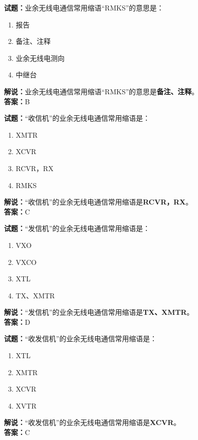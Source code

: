 \documentclass{ctexbook}
\begin{document}
\bigskip


\noindent\textbf{试题：}业余无线电通信常用缩语“RMKS”的意思是：
\begin{enumerate}[leftmargin=3em]
\item 报告
\item 备注、注释
\item 业余无线电测向
\item 中继台
\end{enumerate}
\noindent\textbf{解说：}业余无线电通信常用缩语“RMKS”的意思是\textbf{备注、注释}。\\\noindent\textbf{答案：}B



\bigskip


\noindent\textbf{试题：}“收信机”的业余无线电通信常用缩语是：
\begin{enumerate}[leftmargin=3em]
\item XMTR
\item XCVR
\item RCVR，RX
\item RMKS
\end{enumerate}
\noindent\textbf{解说：}“收信机”的业余无线电通信常用缩语是\textbf{RCVR，RX}。\\\noindent\textbf{答案：}C



\bigskip


\noindent\textbf{试题：}“发信机”的业余无线电通信常用缩语是：
\begin{enumerate}[leftmargin=3em]
\item VXO
\item VXCO
\item XTL
\item TX、XMTR
\end{enumerate}
\noindent\textbf{解说：}“发信机”的业余无线电通信常用缩语是\textbf{TX、XMTR}。\\\noindent\textbf{答案：}D



\bigskip


\noindent\textbf{试题：}“收发信机”的业余无线电通信常用缩语是：
\begin{enumerate}[leftmargin=3em]
\item XTL
\item XMTR
\item XCVR
\item XVTR
\end{enumerate}
\noindent\textbf{解说：}“收发信机”的业余无线电通信常用缩语是\textbf{XCVR}。\\\noindent\textbf{答案：}C
\end{document}
